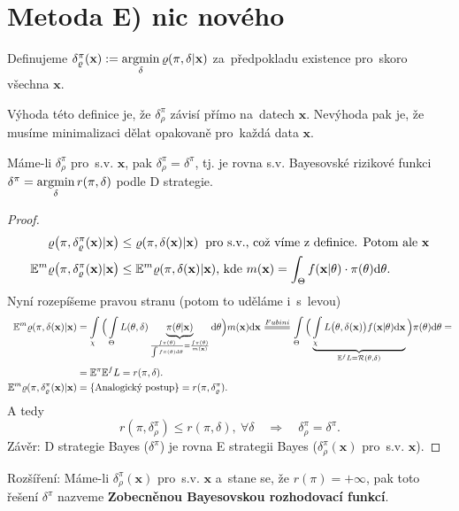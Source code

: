 \section*{Metoda E) nic nového} 
Definujeme $\delta_\varrho^\pi(\textbf{x}):=\mathop{\mathrm{argmin}}\limits_{\delta}\varrho(\pi,\delta|\textbf{x})$ za~předpokladu existence pro~skoro všechna $\textbf{x}$.

\begin{remark}
	Výhoda této definice je, že $\delta_\rho^\pi$ závisí přímo na~datech $\textbf{x}$. Nevýhoda pak je, že musíme minimalizaci dělat opakovaně pro~každá data $\textbf{x}$.
\end{remark}
\begin{theorem}\label{veta_zamena}
	Máme-li $\delta_\rho^\pi$ pro~s.v. $\textbf{x}$, pak $\delta_\rho^\pi=\delta^\pi$, tj. je rovna s.v. Bayesovské rizikové funkci $\delta^\pi=\mathop{\mathrm{argmin}}\limits_\delta r(\pi,\delta)$ podle D strategie.
	\begin{proof}
		\[
		\begin{split}
		\varrho\big(\pi,\delta_\varrho^\pi(\textbf{x})|\textbf{x}\big)&\leq \varrho(\pi,\delta(\textbf{x})|\textbf{x}) \hspace{0.2cm} \text{pro s.v., což víme z~definice. Potom ale } \textbf{x} \\
		\mathbb{E}^m\varrho\big(\pi,\delta_\varrho^\pi(\textbf{x})|\textbf{x}\big)&\leq \mathbb{E}^m\varrho(\pi,\delta(\textbf{x})|\textbf{x})\text{, kde } m(\textbf{x})=\int_{\Theta}f(\textbf{x}|\theta)\cdot \pi(\theta)\mathrm{d}\theta.
		\end{split}
		\]
		Nyní rozepíšeme pravou stranu (potom to uděláme i~s~levou)
		\[
		\begin{split}
		\E^m\rho(\pi,\delta(\textbf{x})|\textbf{x})&=\int\limits_{\chi}\Big( \int\limits_{\Theta} L(\t,\delta)\underbrace{\pi(\t|\textbf{x})}_{\frac{f\pi(\t)}{\int f\pi(\t)\d\t}=\frac{f\pi(\t)}{m(\textbf{x})}}\d\t\Big)m(\textbf{x})\d\textbf{x}\equal{Fubini}\int\limits_{\Theta}\Big( \underbrace{\int\limits_{\chi} L\big(\t,\delta(\textbf{x})\big)f(\textbf{x}|\t)\d\textbf{x}}_{\E^f L=\RF(\t,\delta)} \Big)\pi(\t)\d\t=\\&=\E^\pi\E^f L=r(\pi,\delta). \\
		\E^m\rho(\pi,\delta_\rho^\pi(\textbf{x})|\textbf{x})&=\{\text{Analogický postup}\}=r(\pi,\delta_\rho^\pi).
		\end{split}
		\]
		A tedy 
		$$ r(\pi,\delta_\rho^\pi)\leq r(\pi,\delta),~\forall\delta\quad \Rightarrow\quad \delta_\rho^\pi=\delta^\pi.$$
		Závěr: D strategie Bayes ($\delta^\pi$) je rovna E strategii Bayes ($\delta_\rho^\pi(\textbf{x})$ pro~s.v. $\textbf{x}$).
	\end{proof} 
\end{theorem}
Rozšíření: Máme-li $\delta_\rho^\pi(\textbf{x})$ pro~s.v. $\textbf{x}$ a~stane se, že $r(\pi)=+\infty$, pak toto řešení $\delta^{\pi}$ nazveme \textbf{Zobecněnou Bayesovskou rozhodovací funkcí}.

